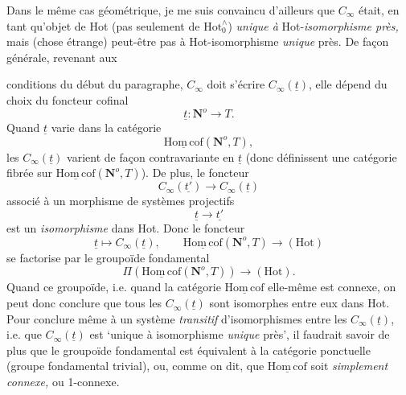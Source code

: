 \documentclass[11pt]{article}
\newcommand{\printedpage}[1]{\marginpar{\footnotesize p.~#1}}
\newcommand{\msp}[1]{\marginpar{\footnotesize [#1]}}
\newcommand{\Hotz}{\mathrm{Hot}^{\wedge}_{0}}
\newcommand{\Hot}{\mathrm{Hot}}
\newcommand{\Hc}{\underline{\mathrm{Hom\,cof}}}
\newcommand{\No}{\mathbf{N}^o}
\begin{document}
Dans le même cas géométrique, je me suis convaincu d'ailleurs que $C_{\infty}$ était, en tant qu'objet de Hot (pas seulement de $\Hotz$) \textit{unique à} Hot-\textit{isomorphisme près,} mais (chose étrange) peut-être pas à Hot-isomorphisme \textit{unique} près. De façon générale, revenant aux

\printedpage{74}
conditions du début du paragraphe, $C_\infty$ doit s'écrire $C_\infty(\underline{t})$, elle dépend du choix du foncteur cofinal
\[
\underline{t} : \No \longrightarrow T.
\]
Quand $\underline{t}$ varie dans la catégorie
\[
\Hc(\No, T),
\]
les $C_\infty(\underline{t})$ varient de façon contravariante en $\underline{t}$ (donc définissent une catégorie fibrée sur $\Hc(\No, T)$). De plus, le foncteur
\[
C_\infty(\underline{t'}) \longrightarrow C_\infty(\underline{t})
\]
associé à un morphisme de systèmes projectifs
\[
\underline{t} \longrightarrow \underline{t'}
\]
est un \textit{isomorphisme} dans Hot. Donc le
\msp{page 118}
foncteur
\[
\underline{t} \longmapsto C_\infty(\underline{t}), \qquad \Hc(\No, T) \longrightarrow (\Hot)
\]
se factorise par le groupoïde fondamental
\[
\Pi(\Hc(\No, T)) \longrightarrow (\Hot).
\]
Quand ce groupoïde, i.e. quand la catégorie $\Hc$ elle-même est connexe, on peut donc conclure que tous les $C_\infty(\underline{t})$ sont isomorphes entre eux dans Hot. Pour conclure même à un système \textit{transitif} d'isomorphismes entre les $C_\infty(\underline{t})$, i.e. que $C_\infty(\underline{t})$ est ‘unique à isomorphisme \textit{unique} près’, il faudrait savoir de plus que le groupoïde fondamental est équivalent à la catégorie ponctuelle (groupe fondamental trivial), ou, comme on dit, que $\Hc$ soit \textit{simplement connexe,} ou 1-connexe.
\end{document}
